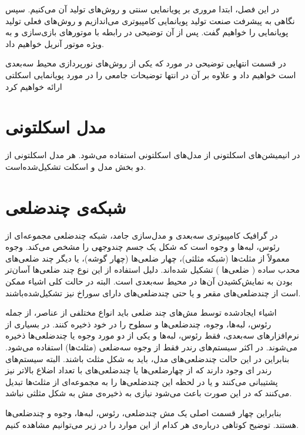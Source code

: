در این فصل، ابتدا مروری بر پویانمایی سنتی و روش‌های تولید آن می‌کنیم. سپس نگاهی به 
پیشرفت صنعت تولید پویانمایی کامپیوتری می‌اندازیم و روش‌های فعلی تولید پویانمایی را خواهیم گفت.
پس از آن توضیحی در رابطه با موتور‌های بازی‌سازی و به ویژه موتور آنریل خواهیم داد.

در قسمت انتهایی توضیحی در مورد 
که یکی از روش‌های نورپردازی محیط سه‌بعدی است خواهیم داد و علاوه بر آن
در انتها توضیحات جامعی را در مورد پویانمایی اسکلتی ارائه خواهیم کرد








\section{مدل اسکلتونی}

در انیمیشن‌های اسکلتونی از مدل‌های اسکلتونی استفاده می‌شود. هر مدل اسکلتونی از دو بخش مدل و اسکلت تشکیل‌شده‌است. 

\section{شبکه‌ی\protect{} چندضلعی}

در گرافیک کامپیوتری سه‌بعدی و مدل‌سازی جامد، شبکه چند‌ضلعی مجموعه‌ای از رئوس، لبه‌ها و وجوه است که شکل یک جسم چند‌وجهی را مشخص می‌کند.
وجوه معمولاً از مثلث‌ها (شبکه مثلثی)، چهار ضلعی‌ها (چهار گوشه)، یا دیگر چند ضلعی‌های محدب ساده
(
	ضلعی‌ها
)
تشکیل شده‌اند. دلیل استفاده از این نوع چند ضلعی‌ها آسان‌تر بودن به نمایش‌کشیدن آن‌ها در محیط سه‌بعدی است.
البته در حالت کلی اشیاء ممکن است از چندضلعی‌های مقعر و یا حتی چندضلعی‌های دارای سوراخ نیز تشکیل‌شده‌باشند.

اشیاء ایجادشده توسط مش‌های چند ضلعی باید انواع مختلفی از عناصر، از جمله رئوس، لبه‌ها، وجوه، چندضلعی‌ها و سطوح را در خود ذخیره کنند.
در بسیاری از نرم‌افزارهای سه‌بعدی، فقط رئوس، لبه‌ها و یکی از دو مورد وجوه یا چند‌ضلعی‌ها ذخیره می‌شوند.
در اکثر سیستم‌های رندر
فقط از وجوه سه‌ضلعی
(مثلث‌ها)
استفاده‌ می‌شود.
بنابراین در این حالت چند‌ضلعی‌های مدل، باید به شکل مثلث باشند. البته سیستم‌های رندر‌ ای وجود دارند که از چهارضلعی‌ها یا چندضلعی‌های با تعداد اضلاع بالاتر نیز پشتیبانی ‌می‌کنند و یا در لحظه این چندضلعی‌ها را به مجموعه‌ای از مثلث‌ها تبدیل می‌کنند که در این صورت باعث ‌می‌شود نیازی به ذخیره‌ی مش به شکل مثلثی نباشد.

بنابراین چهار قسمت اصلی یک مش چندضلعی، رئوس، لبه‌ها، وجوه و چندضلعی‌ها هستند. توضیح کوتاهی درباره‌ی هر کدام از این موارد را در زیر می‌توانیم مشاهده کنیم.

